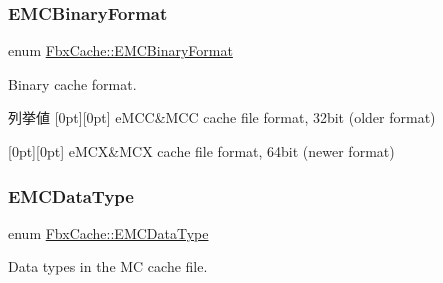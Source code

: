 \subsubsection{\texorpdfstring{E\+M\+C\+Binary\+Format}{EMCBinaryFormat}}
{\footnotesize\ttfamily enum \hyperlink{class_fbx_cache_af3afea849dd371f0b5ecbe135d34b829}{Fbx\+Cache\+::\+E\+M\+C\+Binary\+Format}}



Binary cache format. 

\begin{DoxyEnumFields}{列挙値}
[0pt][0pt]{}\mbox{\label{class_fbx_cache_af3afea849dd371f0b5ecbe135d34b829af019bf2bf0ab0788673f38da0364570c}} 
e\+M\+CC&M\+CC cache file format, 32bit (older format) \\
\hline

[0pt][0pt]{}\mbox{\label{class_fbx_cache_af3afea849dd371f0b5ecbe135d34b829a9f9f7cbd770451b48ea473902dd04568}} 
e\+M\+CX&M\+CX cache file format, 64bit (newer format) \\
\hline

\end{DoxyEnumFields}
\mbox{\label{class_fbx_cache_a80f82fa5f485ff6c46565ffb151998b3}} 
\subsubsection{\texorpdfstring{E\+M\+C\+Data\+Type}{EMCDataType}}
{\footnotesize\ttfamily enum \hyperlink{class_fbx_cache_a80f82fa5f485ff6c46565ffb151998b3}{Fbx\+Cache\+::\+E\+M\+C\+Data\+Type}}



Data types in the MC cache file. 

